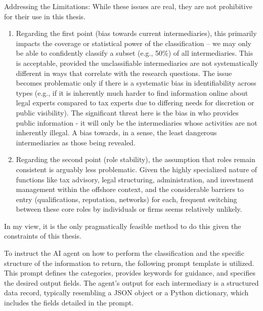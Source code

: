 Addressing the Limitations: While these issues are real, they are not prohibitive for their use in this thesis.
\begin{enumerate}
    \item Regarding the first point (bias towards current intermediaries), this primarily impacts the coverage or statistical power of the classification – we may only be able to confidently classify a subset (e.g., 50\%) of all intermediaries. This is acceptable, provided the unclassifiable intermediaries are not systematically different in ways that correlate with the research questions. The issue becomes problematic only if there is a systematic bias in identifiability across types (e.g., if it is inherently much harder to find information online about legal experts compared to tax experts due to differing needs for discretion or public visibility). The significant threat here is the bias in who provides public information - it will only be the intermediaries whose activities are not inherently illegal. A bias towards, in a sense, the least dangerous intermediaries as those being revealed.
    \item Regarding the second point (role stability), the assumption that roles remain consistent is arguably less problematic. Given the highly specialized nature of functions like tax advisory, legal structuring, administration, and investment management within the offshore context, and the considerable barriers to entry (qualifications, reputation, networks) for each, frequent switching between these core roles by individuals or firms seems relatively unlikely.
\end{enumerate}
In my view, it is the only pragmatically feasible method to do this given the constraints of this thesis.

To instruct the AI agent on how to perform the classification and the specific structure of the information to return, the following prompt template is utilized. This prompt defines the categories, provides keywords for guidance, and specifies the desired output fields. The agent's output for each intermediary is a structured data record, typically resembling a JSON object or a Python dictionary, which includes the fields detailed in the prompt.

